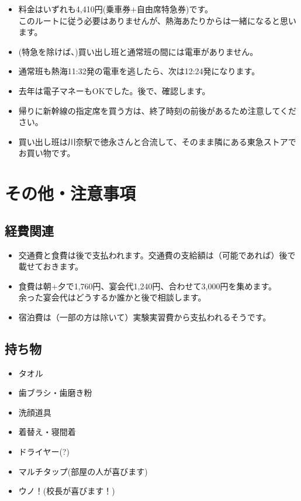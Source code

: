 \documentclass[unicode,a4paper,11pt]{ltjsarticle}
\begin{document}
\begin{itemize}
  \item
        料金はいずれも4,410円(乗車券$+$自由席特急券)です。\\
        このルートに従う必要はありませんが、熱海あたりからは一緒になると思います。
  \item
        (特急を除けば、)買い出し班と通常班の間には電車がありません。
  \item
        通常班も熱海11:32発の電車を逃したら、次は12:24発になります。
  \item
        去年は電子マネーもOKでした。後で、確認します。
  \item
        帰りに新幹線の指定席を買う方は、終了時刻の前後があるため注意してください。
  \item
        買い出し班は川奈駅で徳永さんと合流して、そのまま隣にある東急ストアでお買い物です。
\end{itemize}


\section{その他・注意事項}

\subsection*{経費関連}

\begin{itemize}
  \item
        交通費と食費は後で支払われます。交通費の支給額は（可能であれば）後で載せておきます。
  \item
        食費は朝$+$夕で1,760円、宴会代1,240円、合わせて3,000円を集めます。\\
        余った宴会代はどうするか誰かと後で相談します。
  \item
        宿泊費は（一部の方は除いて）実験実習費から支払われるそうです。
\end{itemize}

\subsection*{持ち物}

\begin{itemize}
  \item
        タオル
  \item
        歯ブラシ・歯磨き粉
  \item
        洗顔道具
  \item
        着替え・寝間着
  \item
        ドライヤー(?)
  \item
        マルチタップ(部屋の人が喜びます)
  \item
        ウノ！(校長が喜びます！)
\end{itemize}
\end{document}

